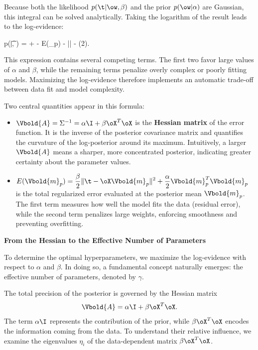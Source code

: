 \medskip
Because both the likelihood $p(\t|\ow,\beta)$ and the prior $p(\ow|\alpha)$ are Gaussian, this integral can be solved analytically. Taking the logarithm of the result leads to the \alert{log-evidence}:

\begin{myequation}
\log p(\t|\alpha, \beta)
= \log \alpha
+ \log \beta
- E(_p)
- \log ||
- \log(2\pi).
\end{myequation}

This expression contains several competing terms. The first two favor large values of $\alpha$ and $\beta$, while the remaining terms penalize overly complex or poorly fitting models. Maximizing the log-evidence therefore implements an automatic trade-off between data fit and model complexity.

\medskip
Two central quantities appear in this formula:

\begin{itemize}
    \item $\Vbold{A} = \Sigma^{-1} = \alpha\I + \beta\oX^T\oX$ is the \textbf{Hessian matrix} of the error function. It is the inverse of the posterior covariance matrix and quantifies the curvature of the log-posterior around its maximum. Intuitively, a larger $\Vbold{A}$ means a sharper, more concentrated posterior, indicating greater certainty about the parameter values.
    
    \item $\displaystyle E(\Vbold{m}_p)
    = \frac{\beta}{2}\|\t - \oX\Vbold{m}_p\|^2
    + \frac{\alpha}{2}\Vbold{m}_p^T\Vbold{m}_p$
    is the total regularized error evaluated at the posterior mean $\Vbold{m}_p$. The first term measures how well the model fits the data (residual error), while the second term penalizes large weights, enforcing smoothness and preventing overfitting.
\end{itemize}

\medskip
\bigskip
\noindent
\textbf{From the Hessian to the Effective Number of Parameters}

To determine the optimal hyperparameters, we maximize the log-evidence with respect to $\alpha$ and $\beta$. In doing so, a fundamental concept naturally emerges: the \alert{effective number of parameters}, denoted by $\gamma$.

The total precision of the posterior is governed by the Hessian matrix
\[
\Vbold{A} = \alpha\I + \beta\oX^T\oX.
\]
The term $\alpha\I$ represents the contribution of the prior, while $\beta\oX^T\oX$ encodes the information coming from the data. To understand their relative influence, we examine the eigenvalues $\eta_i$ of the data-dependent matrix $\beta\oX^T\oX$.

